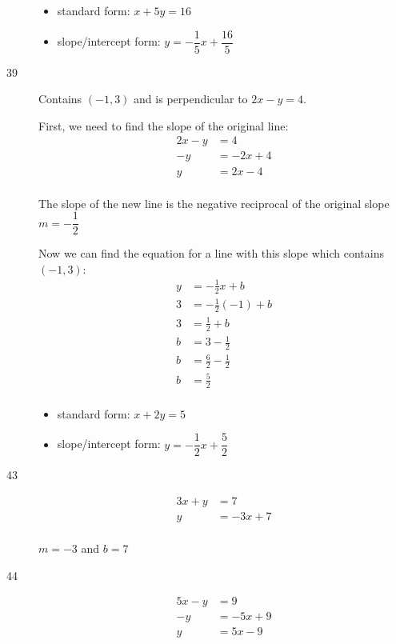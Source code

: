 \documentclass[fleqn,addpoints]{exam}
\begin{document}
\begin{description}
\begin{itemize}
  \item standard form: $x+5y=16$
  \item slope/intercept form: $y = -\dfrac{1}{5} x + \dfrac{16}{5} $
\end{itemize}

\item[39]

Contains $(-1, 3)$ and is perpendicular to $2x-y=4$.

First, we need to find the slope of the original line:
\begin{align*}
  2x-y &= 4 \\
  -y &= -2x + 4 \\
  y &= 2x -4 \\
\end{align*}

The slope of the new line is the negative reciprocal of the original slope $m = - \dfrac{1}{2}$

Now we can find the equation for a line with this slope which contains $(-1, 3)$:
\begin{align*}
  y &= - \frac{1}{2} x + b \\
  3 &= - \frac{1}{2} (-1) + b \\
  3 &= \frac{1}{2} + b \\
  b &= 3 - \frac{1}{2} \\
  b &= \frac{6}{2} - \frac{1}{2} \\
  b &= \frac{5}{2} \\
\end{align*}

\begin{itemize}
  \item standard form: $x+2y=5$
  \item slope/intercept form: $y = -\dfrac{1}{2} x + \dfrac{5}{2}$
\end{itemize}

\item[43]

\begin{align*}
  3x+y &= 7 \\
  y &= -3x + 7 \\
\end{align*}

$m = -3$ and $b = 7$

\item[44]

\begin{align*}
  5x - y &= 9 \\
   - y &= -5x + 9 \\
   y &= 5x - 9 \\
\end{align*}


\end{description}
\end{document}
